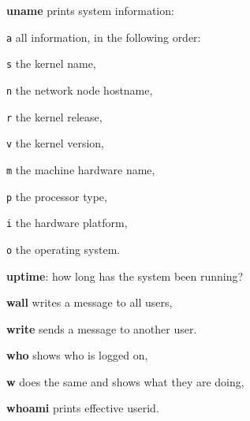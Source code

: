 \begin{enumx}
	\item [\cmd] \textbf{uname} prints system information:
	\item [\texttt{a}] all information, in the following order:
	\item [\texttt{s}] the kernel name,
	\item [\texttt{n}] the network node hostname,
	\item [\texttt{r}] the kernel release,
	\item [\texttt{v}] the kernel version,
	\item [\texttt{m}] the machine hardware name,
	\item [\texttt{p}] the processor type,
	\item [\texttt{i}] the hardware platform,
	\item [\texttt{o}] the operating system.
\end{enumx}

\begin{enumx}
	\item [\cmd] \textbf{uptime}: how long has the system been running?
\end{enumx}

\begin{enumx}
	\item [\cmd] \textbf{wall} writes a message to all users,
	\item [\cmd] \textbf{write} sends a message to another user. 
\end{enumx}

\begin{enumx}
	\item [\cmd] \textbf{who} shows who is logged on,
	\item [\cmd] \textbf{w} does the same and shows what they are doing,
	\item [\cmd] \textbf{whoami} prints effective userid.
\end{enumx}

